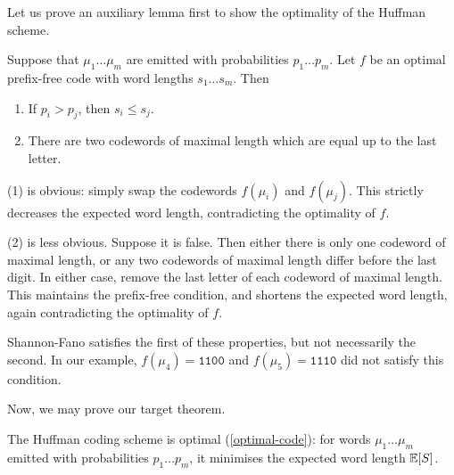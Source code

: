 \documentclass{article}
\begin{document}
Let us prove an auxiliary lemma first to show the optimality of the Huffman scheme.

\begin{proposition}
	\label{sorting-and-almost-equality}
    Suppose that $\mu_1 \dots \mu_m$
    are emitted with probabilities $p_1 \dots p_m$.
    Let $f$ be an optimal prefix-free code
    with word lengths $s_1 \dots s_m$. Then
    
    \begin{enumerate}
	    \item If $p_i > p_j$, then $s_i \leq s_j$.
	    \item There are two codewords of maximal length which are equal up to the last letter.
	\end{enumerate}
\end{proposition}

\begin{prf}
    (1) is obvious:
    simply swap the codewords $f(\mu_i)$ and $f(\mu_j)$.
    This strictly decreases the expected word length,
    contradicting the optimality of $f$.
    
    (2) is less obvious. Suppose it is false.
    Then either there is only one codeword of maximal length,
    or any two codewords of maximal length differ before the last digit.
    In either case, remove the last letter of each codeword of maximal length.
    This maintains the prefix-free condition,
    and shortens the expected word length,
    again contradicting the optimality of $f$.
\end{prf}

\begin{note}
	Shannon-Fano satisfies the first of these properties,
	but not necessarily the second.
	In our example,
	$f(\mu_4) = \texttt{1100}$ and
	$f(\mu_5) = \texttt{1110}$
	did not satisfy this condition.
\end{note}

Now, we may prove our target theorem.

\begin{theorem}
    The Huffman coding scheme is optimal (\ref{optimal-code}):
    for words $\mu_1 \dots \mu_m$
    emitted with probabilities $p_1 \dots p_m$,
    it minimises the expected word length $\mathbb{E}[S]$.
\end{theorem}
\end{document}
